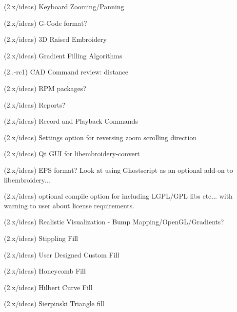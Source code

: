 \begin{DoxyRefList}
\label{todo__todo000105}%
%
(2.\+x/ideas) Keyboard Zooming/\+Panning

\label{todo__todo000106}%
%
(2.\+x/ideas) G-\/\+Code format?

\label{todo__todo000107}%
%
(2.\+x/ideas) 3D Raised Embroidery

\label{todo__todo000108}%
%
(2.\+x/ideas) Gradient Filling Algorithms

\label{todo__todo000055}%
%
(2..-\/rc1) CAD Command review\+: distance

\label{todo__todo000110}%
%
(2.\+x/ideas) RPM packages?

\label{todo__todo000111}%
%
(2.\+x/ideas) Reports?

\label{todo__todo000112}%
%
(2.\+x/ideas) Record and Playback Commands

\label{todo__todo000113}%
%
(2.\+x/ideas) Settings option for reversing zoom scrolling direction

\label{todo__todo000114}%
%
(2.\+x/ideas) Qt GUI for libembroidery-\/convert

\label{todo__todo000115}%
%
(2.\+x/ideas) EPS format? Look at using Ghostscript as an optional add-\/on to libembroidery...

\label{todo__todo000116}%
%
(2.\+x/ideas) optional compile option for including LGPL/\+GPL libs etc... with warning to user about license requirements.

\label{todo__todo000117}%
%
(2.\+x/ideas) Realistic Visualization -\/ Bump Mapping/\+Open\+GL/\+Gradients?

\label{todo__todo000118}%
%
(2.\+x/ideas) Stippling Fill

\label{todo__todo000119}%
%
(2.\+x/ideas) User Designed Custom Fill

\label{todo__todo000120}%
%
(2.\+x/ideas) Honeycomb Fill

\label{todo__todo000121}%
%
(2.\+x/ideas) Hilbert Curve Fill

\label{todo__todo000122}%
%
(2.\+x/ideas) Sierpinski Triangle fill


\end{DoxyRefList}
